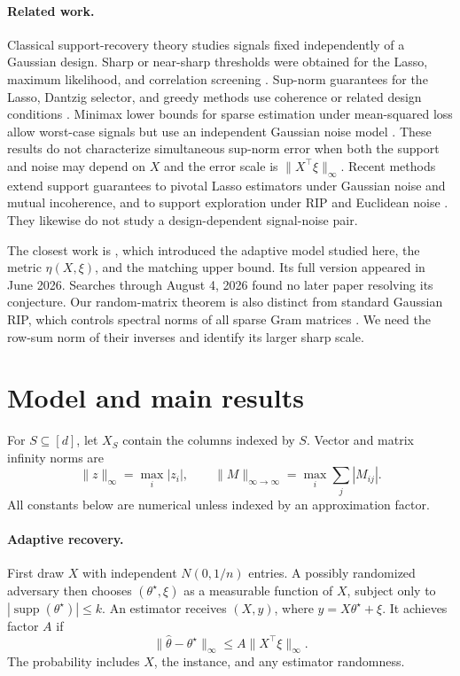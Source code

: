 \documentclass[twoside]{article}
\newcommand{\supp}{\operatorname{supp}}
\begin{document}
\paragraph{Related work.}
Classical support-recovery theory studies signals fixed independently of a
Gaussian design. Sharp or near-sharp thresholds were obtained for the Lasso,
maximum likelihood, and correlation screening
\citep{wainwright2009threshold,fletcher2009support,wainwright2009information}.
Sup-norm guarantees for the Lasso, Dantzig selector, and greedy methods use
coherence or related design conditions
\citep{lounici2008supnorm,ye2010minimax,cai2011omp}. Minimax lower bounds for
sparse estimation under mean-squared loss allow worst-case signals but use an
independent Gaussian noise model \citep{candes2013estimate}. These results do not
characterize simultaneous sup-norm error when both the support and noise may
depend on $X$ and the error scale is $\|X^\top\xi\|_\infty$.
Recent methods extend support guarantees to pivotal Lasso estimators under
Gaussian noise and mutual incoherence, and to support exploration under RIP and
Euclidean noise \citep{massias2020pivotal,mohamed2024sea}. They likewise do not
study a design-dependent signal-noise pair.

The closest work is \citet{chen2026adaptive}, which introduced the adaptive
model studied here, the metric $\eta(X,\xi)$, and the matching upper bound. Its
full version appeared in June 2026. Searches through August 4, 2026 found no
later paper resolving its conjecture. Our random-matrix theorem is also distinct
from standard Gaussian RIP, which controls spectral norms of all sparse Gram
matrices \citep{foucart2013compressive,vershynin2018highdimensional}. We need
the row-sum norm of their inverses and identify its larger sharp scale.

\section{Model and main results}
\label{sec:results}

For $S\subseteq[d]$, let $X_S$ contain the columns indexed by $S$. Vector and
matrix infinity norms are
\[
 \|z\|_\infty=\max_i|z_i|,
 \qquad
 \|M\|_{\infty\to\infty}=\max_i\sum_j|M_{ij}|.
\]
All constants below are numerical unless indexed by an approximation factor.

\paragraph{Adaptive recovery.}
First draw $X$ with independent $N(0,1/n)$ entries. A possibly randomized
adversary then chooses $(\theta^\star,\xi)$ as a measurable function of $X$,
subject only to $|\supp(\theta^\star)|\leq k$. An estimator receives $(X,y)$,
where $y=X\theta^\star+\xi$. It achieves factor $A$ if
\[
 \|\widehat\theta-\theta^\star\|_\infty
 \leq A\|X^\top\xi\|_\infty.
 \tag{1}
\]
The probability includes $X$, the instance, and any estimator randomness.
\end{document}
